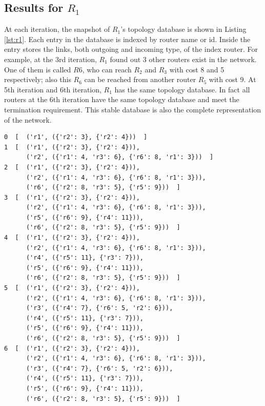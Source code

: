 \documentclass[12pt]{article}  %
\theoremstyle{definition}
\theoremstyle{remark}
\begin{document}
\subsection{Results for $R_1$}
At each iteration, the snapshot of $R_1$'s topology database is shown in Listing \ref{lst:r1}.
Each entry in the database is indexed by router name or id.
Inside the entry stores the links, both outgoing and incoming type, of the index router.
For example, at the 3rd iteration, $R_1$ found out 3 other routers exist in the network.
One of them is called $R6$, who can reach $R_2$ and $R_3$ with cost 8 and 5 respectively;
also this $R_6$ can be reached from another router $R_5$ with cost 9.
At 5th iteration and 6th iteration, $R_1$ has the same topology database.
In fact all routers at the 6th iteration have the same topology database and meet the termination requirement.
This stable database is also the complete representation of the network.

\begin{lstlisting}
0  [  ('r1', ({'r2': 3}, {'r2': 4}))  ]
1  [  ('r1', ({'r2': 3}, {'r2': 4})),
      ('r2', ({'r1': 4, 'r3': 6}, {'r6': 8, 'r1': 3}))  ]
2  [  ('r1', ({'r2': 3}, {'r2': 4})),
      ('r2', ({'r1': 4, 'r3': 6}, {'r6': 8, 'r1': 3})),
      ('r6', ({'r2': 8, 'r3': 5}, {'r5': 9}))  ]
3  [  ('r1', ({'r2': 3}, {'r2': 4})),
      ('r2', ({'r1': 4, 'r3': 6}, {'r6': 8, 'r1': 3})),
      ('r5', ({'r6': 9}, {'r4': 11})),
      ('r6', ({'r2': 8, 'r3': 5}, {'r5': 9}))  ]
4  [  ('r1', ({'r2': 3}, {'r2': 4})),
      ('r2', ({'r1': 4, 'r3': 6}, {'r6': 8, 'r1': 3})),
      ('r4', ({'r5': 11}, {'r3': 7})),
      ('r5', ({'r6': 9}, {'r4': 11})),
      ('r6', ({'r2': 8, 'r3': 5}, {'r5': 9}))  ]
5  [  ('r1', ({'r2': 3}, {'r2': 4})),
      ('r2', ({'r1': 4, 'r3': 6}, {'r6': 8, 'r1': 3})),
      ('r3', ({'r4': 7}, {'r6': 5, 'r2': 6})),
      ('r4', ({'r5': 11}, {'r3': 7})),
      ('r5', ({'r6': 9}, {'r4': 11})),
      ('r6', ({'r2': 8, 'r3': 5}, {'r5': 9}))  ]
6  [  ('r1', ({'r2': 3}, {'r2': 4})),
      ('r2', ({'r1': 4, 'r3': 6}, {'r6': 8, 'r1': 3})),
      ('r3', ({'r4': 7}, {'r6': 5, 'r2': 6})),
      ('r4', ({'r5': 11}, {'r3': 7})),
      ('r5', ({'r6': 9}, {'r4': 11})),
      ('r6', ({'r2': 8, 'r3': 5}, {'r5': 9}))  ]
\end{lstlisting}
\end{document}

